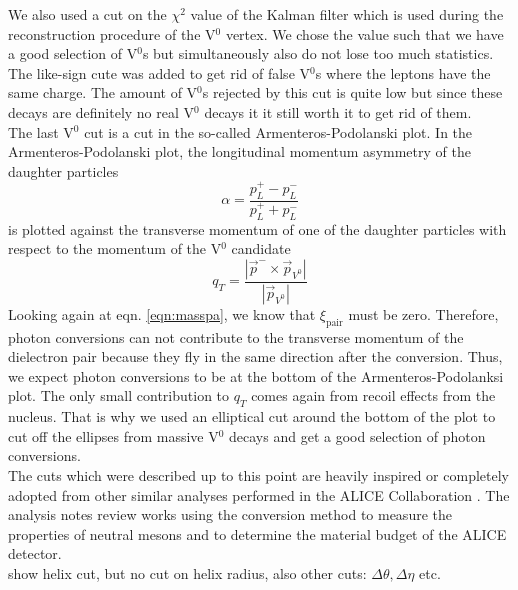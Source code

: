 We also used a cut on the $\chi^2$ value of the Kalman filter which is used during the reconstruction procedure of the V$^0$ vertex. We chose the value such that we have a good selection of V$^0$s but simultaneously also do not lose too much statistics. \\
The like-sign cute was added to get rid of false V$^0$s where the leptons have the same charge. The amount of V$^0$s rejected by this cut is quite low but since these decays are definitely no real V$^0$ decays it it still worth it to get rid of them. \\
The last V$^0$ cut is a cut in the so-called Armenteros-Podolanski plot. In the Armenteros-Podolanski plot, the longitudinal momentum asymmetry of the daughter particles
\begin{equation}
\alpha = \frac{p_L^{+} - p_L^{-}}{p_L^{+} + p_L^{-}}
\end{equation}
is plotted against the transverse momentum of one of the daughter particles with respect to the momentum of the V$^0$ candidate
\begin{equation}
q_T = \frac{|\vec{p}^{-} \times \vec{p}_{V^0}|}{|\vec{p}_{V^0}|}
\end{equation}
Looking again at eqn. \ref{eqn:masspa}, we know that $\xi_{\mathrm{pair}}$ must be zero. Therefore, photon conversions can not contribute to the transverse momentum of the dielectron pair because they fly in the same direction after the conversion. Thus, we expect photon conversions to be at the bottom of the Armenteros-Podolanksi plot. The only small contribution to $q_T$ comes again from recoil effects from the nucleus. That is why we used an elliptical cut around the bottom of the plot to cut off the ellipses from massive V$^0$ decays and get a good selection of photon conversions. \\
The cuts which were described up to this point are heavily inspired or completely adopted from other similar analyses performed in the ALICE Collaboration \cite{ananote1, ananote2}. The analysis notes review works using the conversion method to measure the properties of neutral mesons and to determine the material budget of the ALICE detector. \\



show helix cut, but no cut on helix radius, also other cuts: $\Delta\theta,\Delta\eta$ etc.










